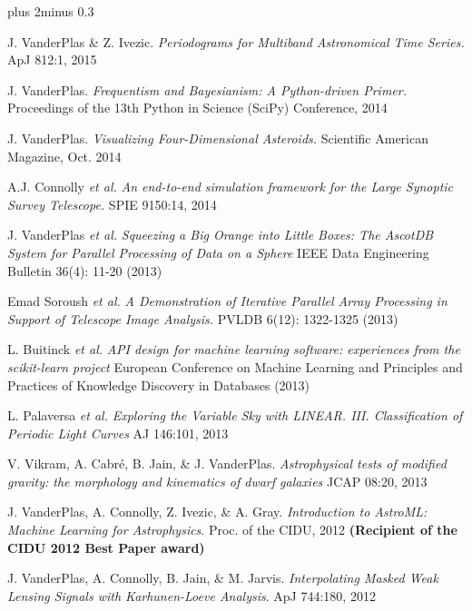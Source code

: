 \documentclass{article} %
\def\bf{\bfseries}
\def\sf{\sffamily}
\def\sl{\slshape}
\newlength\sidebarwidth
\newcommand{\smalltopic}[2]%
	 {\pagebreak[2]%
	 \vskip 1\baselineskip plus 2\baselineskip minus 0.3\baselineskip
	 \begin{minipage}{\textwidth}
         \phantomsection\addcontentsline{toc}{subsection}{#1}%
         \nopagebreak\hspace{0in}%
         \nopagebreak\begin{minipage}[t]{\sidebarwidth - .2cm}
         \raggedleft \bf\sf %
	 \textcolor{dark_blue}{\large #1}%
	 \end{minipage}%
	 \hfill
	 \begin{minipage}[t]{\linewidth - \sidebarwidth}
	 \nopagebreak{%
	    \rule{\linewidth}{.5pt}%
	    \vspace{.1\baselineskip}%
	    }%
	    #2
	 \end{minipage}
	 \end{minipage}}
\begin{document}
\smalltopic{}{

  \begin{itemize}[leftmargin=0ex, itemsep=0ex, parsep=.5ex, labelindent=-4ex]

    \publication
      J. VanderPlas \& Z. Ivezic.
      {\it Periodograms for Multiband Astronomical Time Series.}
      ApJ 812:1, 2015

    \publication
      J. VanderPlas.
      {\it Frequentism and Bayesianism: A Python-driven Primer.}
      Proceedings of the 13th Python in Science (SciPy) Conference, 2014

    \publication
      J. VanderPlas.
      {\it Visualizing Four-Dimensional Asteroids.}
      Scientific American Magazine, Oct. 2014

    \publication
      A.J. Connolly {\it et al.}
      {\it An end-to-end simulation framework for the Large Synoptic Survey Telescope.}
      SPIE 9150:14, 2014

    \publication
      J. VanderPlas {\it et al.}
      {\it Squeezing a Big Orange into Little Boxes: The AscotDB System
        for Parallel Processing of Data on a Sphere}
      IEEE Data Engineering Bulletin 36(4): 11-20 (2013)

    \publication
      Emad Soroush {\it et al.}
      {\it A Demonstration of Iterative Parallel Array Processing in Support
        of Telescope Image Analysis.}
      PVLDB 6(12): 1322-1325 (2013)

    \publication
      L. Buitinck {\it et al.}
      {\it API design for machine learning software:
        experiences from the scikit-learn project}
      European Conference on Machine Learning and Principles and Practices
      of Knowledge Discovery in Databases (2013)

    \publication
      L. Palaversa {\sl et al.}
      {\sl Exploring the Variable Sky with LINEAR. III.
        Classification of Periodic Light Curves}
      AJ 146:101, 2013

    \publication
      V. Vikram, A. Cabr\'{e}, B. Jain, \& J. VanderPlas.
      {\it Astrophysical tests of modified gravity:
        the morphology and kinematics of dwarf galaxies}
      JCAP 08:20, 2013

    \publication
      J. VanderPlas, A. Connolly, Z. Ivezic, \& A. Gray.
      {\sl Introduction to AstroML: Machine Learning for Astrophysics}.
      Proc. of the CIDU, 2012
      {\bf (Recipient of the CIDU 2012 Best Paper award)}

    \publication
      J. VanderPlas, A. Connolly, B. Jain, \& M. Jarvis.
      {\it Interpolating Masked Weak Lensing Signals with Karhunen-Loeve
        Analysis}.
      ApJ 744:180, 2012


\end{itemize}}
\end{document}
